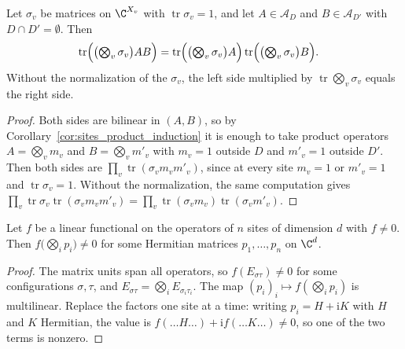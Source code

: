 \begin{lemma}
    \label{lem:sites_product_state_factorization}
    \leanok
    Let $\sigma_v$ be matrices on $\C^{X_v}$ with $\operatorname{tr}\sigma_v=1$, and let
    $A\in\mathcal A_D$ and $B\in\mathcal A_{D'}$ with $D\cap D'=\emptyset$. Then
    \begin{align}
        \operatorname{tr}\Bigl(\bigl(\textstyle\bigotimes_v\sigma_v\bigr)AB\Bigr)
        &=\operatorname{tr}\Bigl(\bigl(\textstyle\bigotimes_v\sigma_v\bigr)A\Bigr)
        \operatorname{tr}\Bigl(\bigl(\textstyle\bigotimes_v\sigma_v\bigr)B\Bigr).
        \notag
    \end{align}
    Without the normalization of the $\sigma_v$, the left side multiplied by
    $\operatorname{tr}\bigotimes_v\sigma_v$ equals the right side.
\end{lemma}
\begin{proof}\leanok
    Both sides are bilinear in $(A,B)$, so by Corollary~\ref{cor:sites_product_induction}
    it is enough to take product operators $A=\bigotimes_vm_v$ and
    $B=\bigotimes_vm'_v$ with $m_v=1$ outside $D$ and $m'_v=1$ outside $D'$. Then both
    sides are $\prod_v\operatorname{tr}(\sigma_vm_vm'_v)$, since at every site $m_v=1$
    or $m'_v=1$ and $\operatorname{tr}\sigma_v=1$. Without the normalization, the same
    computation gives $\prod_v\operatorname{tr}\sigma_v\operatorname{tr}(\sigma_vm_vm'_v)
        =\prod_v\operatorname{tr}(\sigma_vm_v)\operatorname{tr}(\sigma_vm'_v)$.
\end{proof}

\begin{lemma}
    \label{lem:sites_hermitian_product_functional}
    \leanok
    Let $f$ be a linear functional on the operators of $n$ sites of dimension $d$ with
    $f\neq0$. Then $f\bigl(\bigotimes_ip_i\bigr)\neq0$ for some Hermitian matrices
    $p_1,\dots,p_n$ on $\C^d$.
\end{lemma}
\begin{proof}\leanok
    The matrix units span all operators, so $f(E_{\sigma\tau})\neq0$ for some
    configurations $\sigma,\tau$, and $E_{\sigma\tau}=\bigotimes_iE_{\sigma_i\tau_i}$.
    The map $(p_i)_i\mapsto f(\bigotimes_ip_i)$ is multilinear. Replace the factors one
    site at a time: writing $p_i=H+\mathrm iK$ with $H$ and $K$ Hermitian, the value is
    $f(\dots H\dots)+\mathrm if(\dots K\dots)\neq0$, so one of the two terms is nonzero.
\end{proof}

